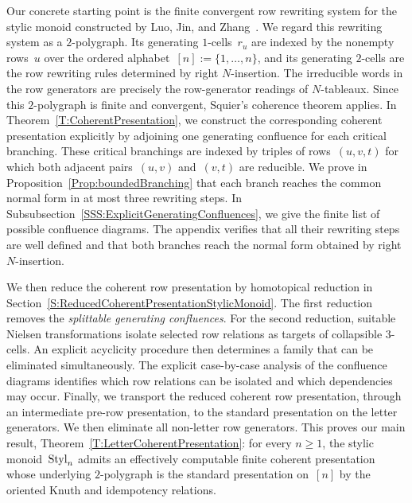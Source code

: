 \documentclass[a4paper, twoside, 11pt, english]{article}
\begin{document}
Our concrete starting point is the finite convergent row rewriting system for the stylic monoid constructed by Luo, Jin, and Zhang~\cite{LuoJinZhangStylic}. We regard this rewriting system as a $2$-polygraph. Its generating $1$-cells~$r_u$ are indexed by the nonempty rows~$u$ over the ordered alphabet~$[n]:=\{1,\ldots,n\}$, and its generating $2$-cells are the row rewriting rules determined by right $N$-insertion. The irreducible words in the row generators are precisely the row-generator readings of $N$-tableaux.
Since this $2$-polygraph is finite and convergent, Squier's coherence theorem applies. In Theorem~\ref{T:CoherentPresentation}, we construct the corresponding coherent presentation explicitly by adjoining one generating confluence for each critical branching. These critical branchings are indexed by triples of rows~$(u,v,t)$ for which both adjacent pairs~$(u,v)$ and~$(v,t)$ are reducible. We prove in Proposition~\ref{Prop:boundedBranching} that each branch reaches the common normal form in at most three rewriting steps. In Subsubsection~\ref{SSS:ExplicitGeneratingConfluences}, we give the finite list of possible confluence diagrams. The appendix verifies that all their rewriting steps are well defined and that both branches reach the normal form obtained by right $N$-insertion.


We then reduce the coherent row presentation by homotopical reduction in
Section~\ref{S:ReducedCoherentPresentationStylicMonoid}. The first reduction removes the \emph{splittable generating confluences}.
For the second reduction, suitable Nielsen transformations isolate
selected row relations as targets of collapsible $3$-cells. An explicit
acyclicity procedure then determines a family that can be eliminated
simultaneously. The explicit case-by-case analysis of the
confluence diagrams identifies which row relations can be isolated and which
dependencies may occur.
Finally, we transport the reduced coherent row presentation, through an
intermediate pre-row presentation, to the standard presentation on the
letter generators. We then eliminate all non-letter row generators.
This proves our main result, Theorem~\ref{T:LetterCoherentPresentation}:
for every $n\geq1$, the stylic monoid~$\mathrm{Styl}_n$ admits an effectively
computable finite coherent presentation whose underlying $2$-polygraph is
the standard presentation on~$[n]$ by the oriented Knuth and idempotency
relations.
\end{document}
